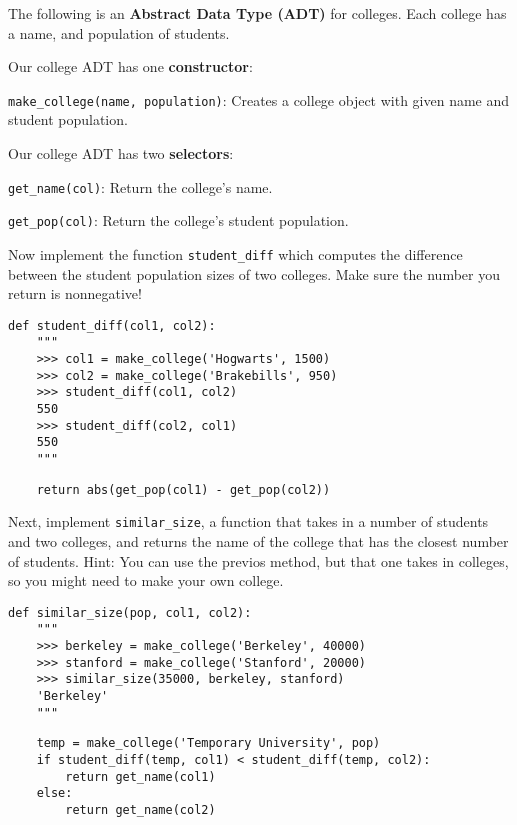 \begin{blocksection}
\question The following is an \textbf{Abstract Data Type (ADT)} for colleges.
Each college has a name, and population of students. 

Our college ADT has one \textbf{constructor}: 

\lstinline{make_college(name, population)}: Creates a college object with given name and student population. 

Our college ADT has two \textbf{selectors}: 

\lstinline{get_name(col)}: Return the college's name. 

\lstinline{get_pop(col)}: Return the college's student population. 

Now implement the function \lstinline{student_diff} which computes the difference between the student population sizes of two colleges. Make sure the number you return is nonnegative!


\begin{lstlisting}
def student_diff(col1, col2):
    """
    >>> col1 = make_college('Hogwarts', 1500)
    >>> col2 = make_college('Brakebills', 950)
    >>> student_diff(col1, col2)
    550
    >>> student_diff(col2, col1)
    550
    """
\end{lstlisting}
\begin{solution}[1in]
\begin{lstlisting}
    return abs(get_pop(col1) - get_pop(col2))

\end{lstlisting}
\end{solution}

\end{blocksection}


\begin{blocksection}
\question Next, implement \lstinline{similar_size}, a function that takes in a number of students and two colleges, and returns the name of the college that has the closest number of students. Hint: You can use the previos method, but that one takes in colleges, so you might need to make your own college.
 
\begin{lstlisting}
def similar_size(pop, col1, col2):
    """
    >>> berkeley = make_college('Berkeley', 40000)
    >>> stanford = make_college('Stanford', 20000)
    >>> similar_size(35000, berkeley, stanford)
    'Berkeley'
    """
\end{lstlisting}
\begin{solution}[1in]
\begin{lstlisting}
    temp = make_college('Temporary University', pop)
    if student_diff(temp, col1) < student_diff(temp, col2):
        return get_name(col1)
    else:
        return get_name(col2)
\end{lstlisting}
\end{solution}

\end{blocksection}

